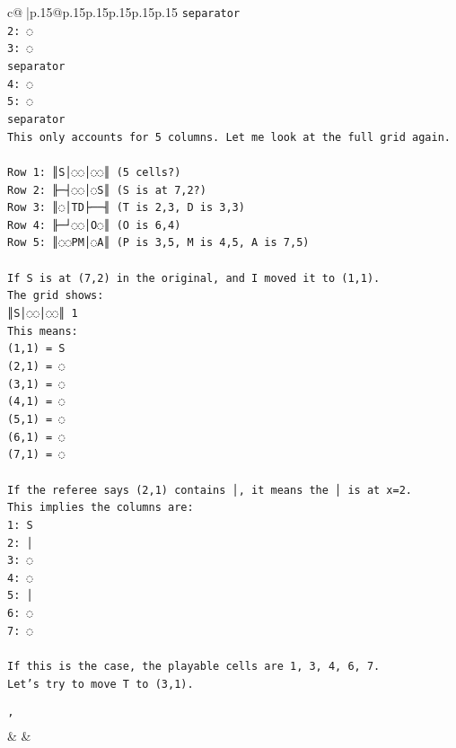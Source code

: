 \documentclass{article}
\begin{document}
{\begin{supertabular}{c@{$\;$}|p{.15\linewidth}@{}p{.15\linewidth}p{.15\linewidth}p{.15\linewidth}p{.15\linewidth}p{.15\linewidth}}
{{{\texttt{separator} \\
\texttt{2: ◌} \\
\texttt{3: ◌} \\
\texttt{separator} \\
\texttt{4: ◌} \\
\texttt{5: ◌} \\
\texttt{separator} \\
\texttt{This only accounts for 5 columns. Let me look at the full grid again.} \\
\\ 
\texttt{Row 1: ║S│◌◌│◌◌║ (5 cells?)} \\
\texttt{Row 2: ╟─┤◌◌│◌S║ (S is at 7,2?)} \\
\texttt{Row 3: ║◌│TD├──╢ (T is 2,3, D is 3,3)} \\
\texttt{Row 4: ╟─┘◌◌│O◌║ (O is 6,4)} \\
\texttt{Row 5: ║◌◌PM│◌A║ (P is 3,5, M is 4,5, A is 7,5)} \\
\\ 
\texttt{If S is at (7,2) in the original, and I moved it to (1,1).} \\
\texttt{The grid shows:} \\
\texttt{║S│◌◌│◌◌║ 1} \\
\texttt{This means:} \\
\texttt{(1,1) = S} \\
\texttt{(2,1) = ◌} \\
\texttt{(3,1) = ◌} \\
\texttt{(4,1) = ◌} \\
\texttt{(5,1) = ◌} \\
\texttt{(6,1) = ◌} \\
\texttt{(7,1) = ◌} \\
\\ 
\texttt{If the referee says (2,1) contains │, it means the │ is at x=2.} \\
\texttt{This implies the columns are:} \\
\texttt{1: S} \\
\texttt{2: │} \\
\texttt{3: ◌} \\
\texttt{4: ◌} \\
\texttt{5: │} \\
\texttt{6: ◌} \\
\texttt{7: ◌} \\
\\ 
\texttt{If this is the case, the playable cells are 1, 3, 4, 6, 7.} \\
\texttt{Let's try to move T to (3,1).} \\
\\ 
\texttt{'} \\
            }
        }
    }
    & & \\ \\


\end{supertabular}}
\end{document}
